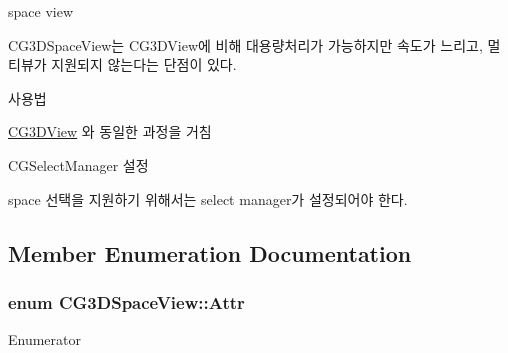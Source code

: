 \begin{DoxyItemize}
\item space view
\item C\+G3\+D\+Space\+View는 C\+G3\+D\+View에 비해 대용량처리가 가능하지만 속도가 느리고, 멀티뷰가 지원되지 않는다는 단점이 있다.
\item 사용법
\begin{DoxyItemize}
\item \hyperlink{class_c_g3_d_view}{C\+G3\+D\+View} 와 동일한 과정을 거침
\item C\+G\+Select\+Manager 설정
\begin{DoxyItemize}
\item space 선택을 지원하기 위해서는 select manager가 설정되어야 한다. 
\end{DoxyItemize}
\end{DoxyItemize}
\end{DoxyItemize}

\subsection{Member Enumeration Documentation}
\hypertarget{class_c_g3_d_space_view_a41938b01269706c0aa66a46634d379b0}{}
\subsubsection[{Attr}]{\setlength{\rightskip}{0pt plus 5cm}enum {\bf C\+G3\+D\+Space\+View\+::\+Attr}}\label{class_c_g3_d_space_view_a41938b01269706c0aa66a46634d379b0}
\begin{Desc}
\item[Enumerator]\par
\begin{description}
\item[{\em 
\hypertarget{class_c_g3_d_space_view_a41938b01269706c0aa66a46634d379b0a52b81a23d5a3b83d9b808e23015bb888}{}e\+Attr\+Display\+Space\label{class_c_g3_d_space_view_a41938b01269706c0aa66a46634d379b0a52b81a23d5a3b83d9b808e23015bb888}
}]\item[{\em 
\hypertarget{class_c_g3_d_space_view_a41938b01269706c0aa66a46634d379b0a919956879c03b94c4717b463671daba9}{}e\+Attr\+Lock\+End\+Zoom\label{class_c_g3_d_space_view_a41938b01269706c0aa66a46634d379b0a919956879c03b94c4717b463671daba9}
}]\end{description}
\end{Desc}


